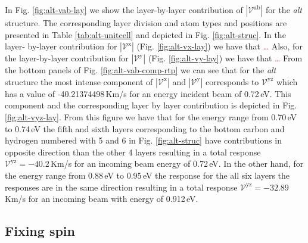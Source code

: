 \documentclass[prb,11pt,tightenlines,twocolumn,aps]{revtex4-1}
\begin{document}
In Fig. \ref{fig:alt-vab-lay} we show the layer-by-layer contribution of
$|\mathcal{V}^{\mathrm{ab}}|$  for the \emph{alt} structure. The corresponding
layer division and atom types and positions are presented in Table 
% 
\ref{tab:alt-unitcell} and depicted in Fig. \ref{fig:alt-struc}. In the layer-
by-layer contribution for $|\mathcal{V}^{\mathrm{x}}|$ (Fig. \ref{fig:alt-vx-lay})
we have that
% 
\textcolor{red}{\ldots}
% 
Also, for the layer-by-layer contribution for $|\mathcal{V}^{\mathrm{y}}|$ (Fig.
\ref{fig:alt-vy-lay}) we have that
% 
\textcolor{red}{\ldots}
%
From the bottom panels of Fig. \ref{fig:alt-vab-comp-rtp} we can see that for
the \emph{alt} structure the most intense component of
$|\mathcal{V}^{\mathrm{x}}|$ and $|\mathcal{V}^{\mathrm{y}}|$ corresponds to
$\mathcal{V}^{\mathrm{yz}}$ which has a value of -40.21374498\,Km/s for an
energy incident beam of 0.72\,eV. This component and the corresponding layer by
layer contribution is depicted in Fig. \ref{fig:alt-vyz-lay}. From this figure
we have that for the energy range from 0.70\,eV to 0.74\,eV the fifth and sixth
layers corresponding to the bottom carbon and hydrogen numbered with 5 and 6 in
Fig. \ref{fig:alt-struc} have contributions in opposite direction than the other
4 layers resulting in a total response $\mathcal{V}^{\mathrm{yz}}= -40.2$\,Km/s
for an incoming beam energy of 0.72\,eV. In the other hand, for the energy range
from 0.88\,eV to 0.95\,eV the response for the all six layers the responses are
in the same direction resulting in a total response
$\mathcal{V}^{\mathrm{yz}}=-32.89$\,Km/s for an incoming beam with energy of
0.912\,eV.




\subsection{Fixing spin} %
\label{sec:res-fixspin}






\end{document}
